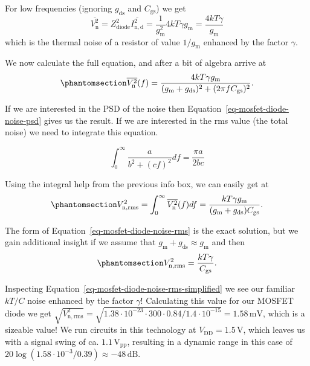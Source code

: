 \documentclass[
  a4paper,
  DIV=11,
  numbers=noendperiod]{scrartcl}
\begin{document}
For low frequencies (ignoring \(g_\mathrm{ds}\) and \(C_\mathrm{gs}\))
we get \[
\overline{V_\mathrm{n}^2} = Z_\mathrm{diode}^2 \overline{I_\mathrm{n,d}^2} = \frac{1}{g_\mathrm{m}^2} 4 k T \gamma g_\mathrm{m}= \frac{4 k T \gamma}{g_\mathrm{m}}
\] which is the thermal noise of a resistor of value
\(1 / g_\mathrm{m}\) enhanced by the factor \(\gamma\).

We now calculate the full equation, and after a bit of algebra arrive at
\begin{equation}\phantomsection\label{eq-mosfet-diode-noise-psd}{
\overline{V_\mathrm{n}^2}(f) = \frac{4 k T \gamma g_\mathrm{m}}{(g_\mathrm{m}+ g_\mathrm{ds})^2 + (2 \pi f C_\mathrm{gs})^2}.
}\end{equation}

If we are interested in the PSD of the noise then
Equation~\ref{eq-mosfet-diode-noise-psd} gives us the result. If we are
interested in the rms value (the total noise) we need to integrate this
equation.

\[
\int_0^\infty {\frac{a}{b^2 + (c f)^2} df} = \frac{\pi a}{2 b c}
\]

Using the integral help from the previous info box, we can easily get at
\begin{equation}\phantomsection\label{eq-mosfet-diode-noise-rms}{
V_\mathrm{n,rms}^2 = \int_0^\infty \overline{V_\mathrm{n}^2}(f) df = \frac{k T \gamma g_\mathrm{m}}{(g_\mathrm{m}+ g_\mathrm{ds}) C_\mathrm{gs}}.
}\end{equation}

The form of Equation~\ref{eq-mosfet-diode-noise-rms} is the exact
solution, but we gain additional insight if we assume that
\(g_\mathrm{m}+ g_\mathrm{ds}\approx g_\mathrm{m}\) and then
\begin{equation}\phantomsection\label{eq-mosfet-diode-noise-rms-simplified}{
V_\mathrm{n,rms}^2 = \frac{k T \gamma}{C_\mathrm{gs}}.
}\end{equation}

Inspecting Equation~\ref{eq-mosfet-diode-noise-rms-simplified} we see
our familiar \(kT/C\) noise enhanced by the factor \(\gamma\)!
Calculating this value for our MOSFET diode we get
\(\sqrt{V_\mathrm{n,rms}^2} = \sqrt{1.38 \cdot 10^{-23} \cdot 300 \cdot 0.84 / 1.4 \cdot 10^{-15}} = 1.58\,\text{mV}\),
which is a sizeable value! We run circuits in this technology at
\(V_\mathrm{DD}= 1.5\,\mathrm{V}\), which leaves us with a signal swing
of ca. \(1.1\,\mathrm{V_{pp}}\), resulting in a dynamic range in this
case of \(20 \log (1.58 \cdot 10^{-3} / 0.39) \approx -48\,\text{dB}\).
\end{document}
